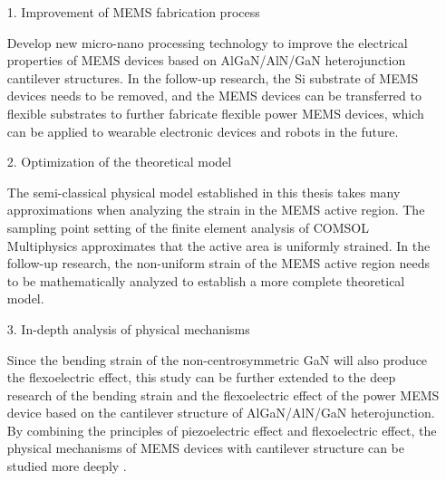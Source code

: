 \begin{itemize}
	\item [1.] Improvement of MEMS fabrication process
	
Develop new micro-nano processing technology to improve the electrical properties of MEMS devices based on AlGaN/AlN/GaN heterojunction cantilever  structures. In the follow-up research, the Si substrate of MEMS devices needs to be removed, and the MEMS devices can be transferred to flexible substrates to further fabricate flexible power MEMS devices, which can be applied to wearable electronic devices and robots in the future.
	
	\item [2.] Optimization of the theoretical model 

The semi-classical physical model established in this thesis takes many approximations when analyzing the strain in the MEMS active region. The sampling point setting of the finite element analysis of COMSOL Multiphysics approximates that the active area is uniformly strained. In the follow-up research, the non-uniform strain of the MEMS active region needs to be mathematically analyzed to establish a more complete theoretical model.
	
	\item [3.] In-depth analysis of physical mechanisms
	
Since the bending strain of the non-centrosymmetric GaN will also produce the flexoelectric effect, this study can be further extended to the deep research of the bending strain and the flexoelectric effect of the power MEMS device based on the cantilever structure of AlGaN/AlN/GaN heterojunction. By combining the principles of piezoelectric effect and flexoelectric effect, the physical mechanisms of MEMS devices with cantilever structure can be studied more deeply \cite{bhaskar2016flexoelectric,yudin2013fundamentals,
zubko2013flexoelectric,yan2013flexoelectric,shu2019flexoelectric,zhai1flexoelectronics,wang2020flexoelectronics}.
	
\end{itemize}
